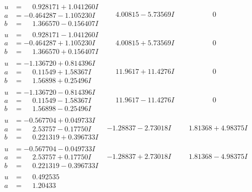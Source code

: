 \documentclass[1p]{elsarticle_modified}
\theoremstyle{definition}
\begin{document}
$$\begin{array}{c|c|c}
 \hline 
\begin{aligned}
u &= \phantom{-}0.928171 + 1.041260 I \\
a &= -0.464287 - 1.105230 I \\
b &= \phantom{-}1.366570 - 0.156407 I\end{aligned}
 & \phantom{-}4.00815 - 5.73569 I & \phantom{-0.000000 } 0 \\ \hline\begin{aligned}
u &= \phantom{-}0.928171 - 1.041260 I \\
a &= -0.464287 + 1.105230 I \\
b &= \phantom{-}1.366570 + 0.156407 I\end{aligned}
 & \phantom{-}4.00815 + 5.73569 I & \phantom{-0.000000 } 0 \\ \hline\begin{aligned}
u &= -1.136720 + 0.814396 I \\
a &= \phantom{-}0.11549 + 1.58367 I \\
b &= \phantom{-}1.56898 + 0.25496 I\end{aligned}
 & \phantom{-}11.9617 + 11.4276 I & \phantom{-0.000000 } 0 \\ \hline\begin{aligned}
u &= -1.136720 - 0.814396 I \\
a &= \phantom{-}0.11549 - 1.58367 I \\
b &= \phantom{-}1.56898 - 0.25496 I\end{aligned}
 & \phantom{-}11.9617 - 11.4276 I & \phantom{-0.000000 } 0 \\ \hline\begin{aligned}
u &= -0.567704 + 0.049733 I \\
a &= \phantom{-}2.53757 - 0.17750 I \\
b &= \phantom{-}0.221319 + 0.396733 I\end{aligned}
 & -1.28837 - 2.73018 I & \phantom{-}1.81368 + 4.98375 I \\ \hline\begin{aligned}
u &= -0.567704 - 0.049733 I \\
a &= \phantom{-}2.53757 + 0.17750 I \\
b &= \phantom{-}0.221319 - 0.396733 I\end{aligned}
 & -1.28837 + 2.73018 I & \phantom{-}1.81368 - 4.98375 I \\ \hline\begin{aligned}
u &= \phantom{-}0.492535\phantom{ +0.000000I} \\
a &= \phantom{-}1.20433\phantom{ +0.000000I} \\

\end{aligned}
\end{array}$$
\end{document}
